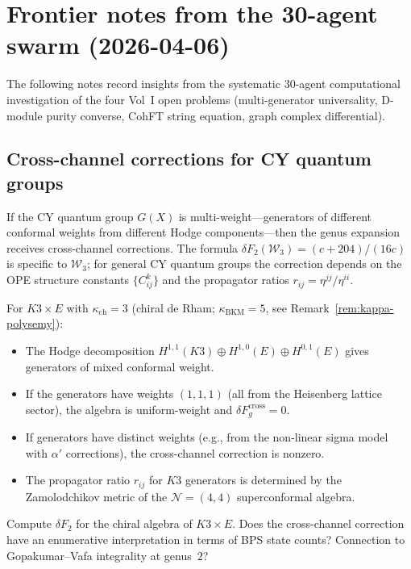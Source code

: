 \documentclass[11pt]{article}
\newcommand{\cN}{\mathcal{N}}
\newcommand{\cW}{\mathcal{W}}
\begin{document}
\section{Frontier notes from the 30-agent swarm (2026-04-06)}
\label{sec:swarm-frontier-notes}

The following notes record insights from the systematic 30-agent
computational investigation of the four Vol~I open problems
(multi-generator universality, D-module purity converse, CohFT
string equation, graph complex differential).

\subsection{Cross-channel corrections for CY quantum groups}

If the CY quantum group $G(X)$ is multi-weight---generators of
different conformal weights from different Hodge components---then
the genus expansion receives cross-channel corrections. The formula
$\delta F_2(\cW_3) = (c + 204)/(16c)$ is specific to $\cW_3$; for
general CY quantum groups the correction depends on the OPE structure
constants $\{C^k_{ij}\}$ and the propagator ratios
$r_{ij} = \eta^{jj}/\eta^{ii}$.

For $K3 \times E$ with $\kappa_{\mathrm{ch}} = 3$ (chiral de Rham; $\kappa_{\mathrm{BKM}} = 5$, see Remark~\ref{rem:kappa-polysemy}):
\begin{itemize}
 \item The Hodge decomposition $H^{1,1}(K3) \oplus H^{1,0}(E) \oplus
 H^{0,1}(E)$ gives generators of mixed conformal weight.
 \item If the generators have weights $(1, 1, 1)$ (all from
 the Heisenberg lattice sector), the algebra is uniform-weight and
 $\delta F_g^{\mathrm{cross}} = 0$.
 \item If generators have distinct weights (e.g., from the
 non-linear sigma model with $\alpha'$ corrections), the
 cross-channel correction is nonzero.
 \item The propagator ratio $r_{ij}$ for $K3$ generators is
 determined by the Zamolodchikov metric of the $\cN = (4,4)$
 superconformal algebra.
\end{itemize}

\begin{question}
Compute $\delta F_2$ for the chiral algebra of $K3 \times E$.
Does the cross-channel correction have an enumerative interpretation
in terms of BPS state counts? Connection to Gopakumar--Vafa
integrality at genus~$2$?
\end{question}
\end{document}
